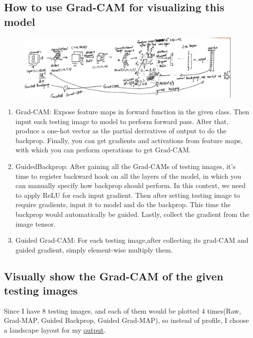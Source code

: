 \documentclass[12pt]{article}
\begin{document}
\subsection{How to use Grad-CAM for visualizing this model}
\begin{figure}[h]
    \centering
    \includegraphics[width=1\linewidth]{../how.jpg}
    \end{figure}
\begin{enumerate}
    \item Grad-CAM: Expose feature maps in forward function in the given class. Then input each testing image to model to perform forward pass. After that, produce a one-hot vector as the partial derivatives of output to do the backprop. Finally, you can get gradients and activations from feature maps, with which you can perform operations to get Grad-CAM.
    \item GuidedBackprop: After gaining all the Grad-CAMs of testing images, it's time to register backward hook on all the layers of the model, in which you can manually specify how backprop should perform. In this context, we need to apply ReLU for each input gradient. Then after setting testing image to require gradients, input it to model and do the backprop. This time the backprop would automatically be guided. Lastly, collect the gradient from the image tensor.
    \item Guided Grad-CAM: For each testing image,after collecting its grad-CAM and guided gradient, simply element-wise multiply them.
\end{enumerate}

\subsection{Visually show the Grad-CAM of the given testing images}

Since I have 8 testing images, and each of them would be plotted 4 times(Raw, Grad-MAP, Guided Backprop, Guided Grad-MAP), so instead of profile, I choose a landscape layout for my \hyperref[fig:output]{output}.
\end{document}
